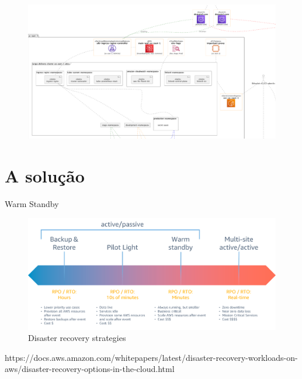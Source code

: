 \documentclass[aspectratio=169]{beamer}
\begin{document}
\begin{frame}
\begin{figure}
	\centering
	\includegraphics[width=\linewidth]{Images/problema}

\end{figure}
\end{frame}


{
	\section{A solução}
}


\begin{frame}{Warm Standby}
\begin{figure}
	\centering
	\includegraphics[width=0.9\linewidth]{Images/warmsandby}
	\caption{Disaster recovery strategies}
	\label{fig:warmsandby}
\end{figure}
https://docs.aws.amazon.com/whitepapers/latest/disaster-recovery-workloads-on-aws/disaster-recovery-options-in-the-cloud.html
\end{frame}
\end{document}
